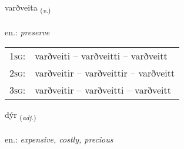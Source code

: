 \documentclass[frontgrid, backgrid]{flacards}\usepackage[]{graphicx}\usepackage[]{xcolor}
\begin{document}
\renewcommand{\flhead}{\vskip5pt \fboxsep=0pt {\small\bfseries\footnotesize Sagnorð | Verb}}
\renewcommand{\fcfoot}{\vskip5pt \fboxsep=0pt \hspace{2pt}{\small\bfseries\footnotesize 2K}}

\renewcommand{\blhead}{\vskip5pt {\small\bfseries\footnotesize Sagnorð | Verb }}
\renewcommand{\bcfoot}{\vskip5pt \hspace{2pt}{\small\bfseries\footnotesize 2K}}


{varðveita \small{\textsubscript{(\textit{v.})}} \\[1ex] %
\textphonetic{[varðveita]} \\
en.: \emph{preserve} \\  [2ex]
\renewcommand*{\arraystretch}{0.8}
\begin{tabular}{p{1cm}l}
\textsc{1sg}: & varðveiti -- varðveitti -- varðveitt \\ 
\textsc{2sg}: & varðveitir -- varðveittir -- varðveitt \\ 
\textsc{3sg}: & varðveitir -- varðveitti -- varðveitt \\ 
\end{tabular}
}

\renewcommand{\flhead}{\vskip5pt \fboxsep=0pt {\small\bfseries\footnotesize Lýsingarorð | Adjective}}
\renewcommand{\fcfoot}{\vskip5pt \fboxsep=0pt \hspace{2pt}{\small\bfseries\footnotesize 2K}}

\renewcommand{\blhead}{\vskip5pt {\small\bfseries\footnotesize Lýsingarorð | Adjective }}
\renewcommand{\bcfoot}{\vskip5pt \hspace{2pt}{\small\bfseries\footnotesize 2K}}


{dýr \small{\textsubscript{(\textit{adj.})}} \\[1ex] %
\textphonetic{[tiːr]} \\
en.: \emph{expensive, costly, precious} \\  [2ex]
\renewcommand*{\arraystretch}{0.8}
}
\end{document}
